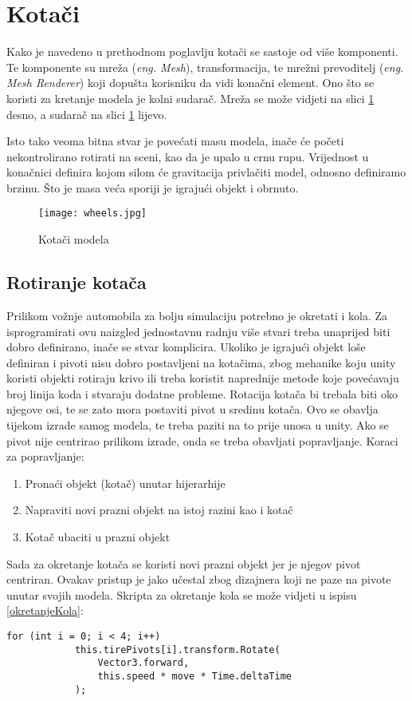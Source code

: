 \section{Kotači}
Kako je navedeno u prethodnom poglavlju kotači se sastoje od više komponenti. Te komponente su mreža (\emph{eng. Mesh}), transformacija, te mrežni prevoditelj (\emph{eng. Mesh Renderer}) koji dopušta korisniku da vidi konačni element. Ono što se koristi za kretanje modela je kolni sudarač. Mreža se može vidjeti na slici \ref{fig:kotaci} desno, a sudarač na slici \ref{fig:kotaci} lijevo. \par
Isto tako veoma bitna stvar je povećati masu modela, inače će početi nekontrolirano rotirati na sceni, kao da je upalo u crnu rupu. Vrijednost u konačnici definira kojom silom će gravitacija privlačiti model, odnosno definiramo brzinu. Što je masa veća sporiji je igrajući objekt i obrnuto.

\begin{figure}[h]
	\texttt{[image: wheels.jpg]}
	\centering
	\caption{Kotači modela}
	\label{fig:kotaci}
\end{figure}

\subsection{Rotiranje kotača}
Prilikom vožnje automobila za bolju simulaciju potrebno je okretati i kola. Za isprogramirati ovu naizgled jednostavnu radnju više stvari treba unaprijed biti dobro definirano, inače se stvar komplicira. Ukoliko je igrajući objekt loše definiran i pivoti nisu dobro postavljeni na kotačima, zbog mehanike koju unity koristi objekti rotiraju krivo ili treba koristit naprednije metode koje povećavaju broj linija koda i stvaraju dodatne probleme. Rotacija kotača bi trebala biti oko njegove osi, te se zato mora postaviti pivot u sredinu kotača. Ovo se obavlja tijekom izrade samog modela, te treba paziti na to prije unosa u unity. Ako se pivot nije centrirao prilikom izrade, onda se treba obavljati popravljanje. Koraci za popravljanje:
\begin{enumerate}
	\item Pronaći objekt (kotač) unutar hijerarhije
	\item Napraviti novi prazni objekt na istoj razini kao i kotač
	\item Kotač ubaciti u prazni objekt
\end{enumerate}
Sada za okretanje kotača se koristi novi prazni objekt jer je njegov pivot centriran. Ovakav pristup je jako učestal zbog dizajnera koji ne paze na pivote unutar svojih modela. Skripta za okretanje kola se može vidjeti u ispisu \ref{okretanjeKola}:
\begin{lstlisting}[caption={Skripta za okretanje kola}, label=okretanjeKola]
for (int i = 0; i < 4; i++) 
			this.tirePivots[i].transform.Rotate(
			    Vector3.forward, 
			    this.speed * move * Time.deltaTime
			);	
\end{lstlisting}
